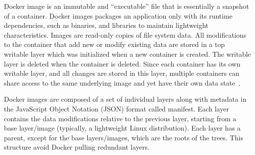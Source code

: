 Docker image is an immutable and ``executable'' file that is essentially a snapshot of a container.
%
%
Docker images packages an application only with its runtime dependencies, such as binaries, and libraries to maintain lightweight characteristics.
%
Images are read-only copies of file system data.
%
All modifications to the container that add new or modify existing data are stored in a top writable layer which was initialized when a new container is created.
%
The writable layer is deleted when the container is deleted.
%
Since each container has its own writable layer, and all changes are stored in this layer, multiple containers can share access to the same underlying image and yet have their own data state~\cite{}.



 


Docker images are composed of a set of individual layers along with metadata in the JavaScript Object Notation (JSON) format called manifest.
%
Each layer contains the data modifications relative to the previous layer, starting from a base layer/image (typically, a lightweight Linux distribution).
%
%
Each layer has a parent, except for the base layers/images, which are the roots of the trees.
%
This structure avoid Docker pulling redundant layers.
%




